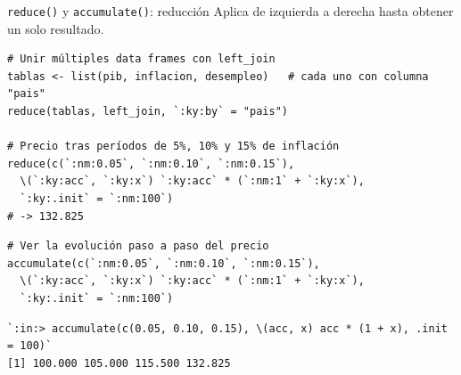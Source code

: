 \documentclass[8pt]{beamer}
\begin{document}
	\begin{frame}[fragile]{\texttt{reduce()} y \texttt{accumulate()}: reducción}
		Aplica  de izquierda a derecha hasta obtener un solo resultado.

\begin{lstlisting}[style=RScript]
# Unir múltiples data frames con left_join
tablas <- list(pib, inflacion, desempleo)   # cada uno con columna "pais"
reduce(tablas, left_join, `:ky:by` = "pais")

# Precio tras períodos de 5%, 10% y 15% de inflación
reduce(c(`:nm:0.05`, `:nm:0.10`, `:nm:0.15`),
  \(`:ky:acc`, `:ky:x`) `:ky:acc` * (`:nm:1` + `:ky:x`),
  `:ky:.init` = `:nm:100`)
# -> 132.825
\end{lstlisting}


\begin{lstlisting}[style=RScript]
# Ver la evolución paso a paso del precio
accumulate(c(`:nm:0.05`, `:nm:0.10`, `:nm:0.15`),
  \(`:ky:acc`, `:ky:x`) `:ky:acc` * (`:nm:1` + `:ky:x`),
  `:ky:.init` = `:nm:100`)
\end{lstlisting}
\begin{lstlisting}[style=RConsole]
`:in:> accumulate(c(0.05, 0.10, 0.15), \(acc, x) acc * (1 + x), .init = 100)`
[1] 100.000 105.000 115.500 132.825
\end{lstlisting}
	\end{frame}
\end{document}
